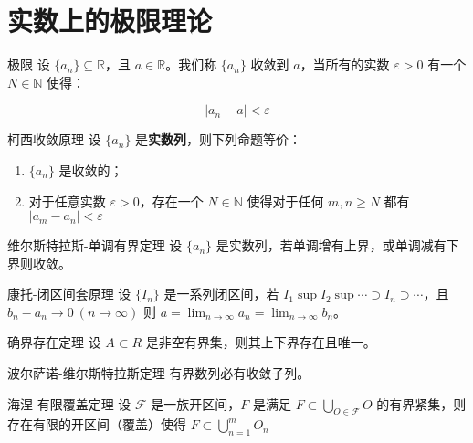 \section{实数上的极限理论}

\begin{definition}{极限}{}
	设 $\{a_n\}\subseteq \mathbb R$，且 $a\in \mathbb R$。我们称 $\{a_n\}$ 收敛到 $a$，当所有的实数 $\varepsilon > 0$ 有一个 $N\in \mathbb N$ 使得：
	
$$
|a_n - a | < \varepsilon
$$
\end{definition}

\begin{theorem}{柯西收敛原理}{}
	设 $\{a_n\}$ 是\textbf{实数列}，则下列命题等价：
	
	\begin{enumerate}
		\item $\{a_n\}$ 是收敛的；
		\item 对于任意实数 $\varepsilon > 0$，存在一个 $N\in \mathbb N$ 使得对于任何 $m,n\ge N$ 都有 $|a_m - a_n| < \varepsilon$
	\end{enumerate}
\end{theorem}

\begin{theorem}{维尔斯特拉斯-单调有界定理}{}
	设 $\{a_n\}$ 是实数列，若单调增有上界，或单调减有下界则收敛。
\end{theorem}

\begin{theorem}{康托-闭区间套原理}{}
	设 $\{I_n\}$ 是一系列闭区间，若 $I_1\sup I_2 \sup \cdots \supset I_n\supset\cdots$，且 $b_n - a_n \rightarrow 0~(n\rightarrow \infty)$ 则 $a = \lim_{n\rightarrow \infty } a_n = \lim _{n\rightarrow \infty} b_n$。
\end{theorem}

\begin{theorem}{确界存在定理}{}
	设 $A\subset R$ 是非空有界集，则其上下界存在且唯一。
\end{theorem}

\begin{theorem}{波尔萨诺-维尔斯特拉斯定理}{}
	有界数列必有收敛子列。
\end{theorem}

\begin{theorem}{海涅-有限覆盖定理}{}
	设 $\mathcal F$ 是一族开区间，$F$ 是满足 $F\subset \bigcup _{O\in \mathcal F} O$ 的有界紧集，则存在有限的开区间（覆盖）使得 $F\subset \bigcup _{n=1} ^m O_n$
\end{theorem}











